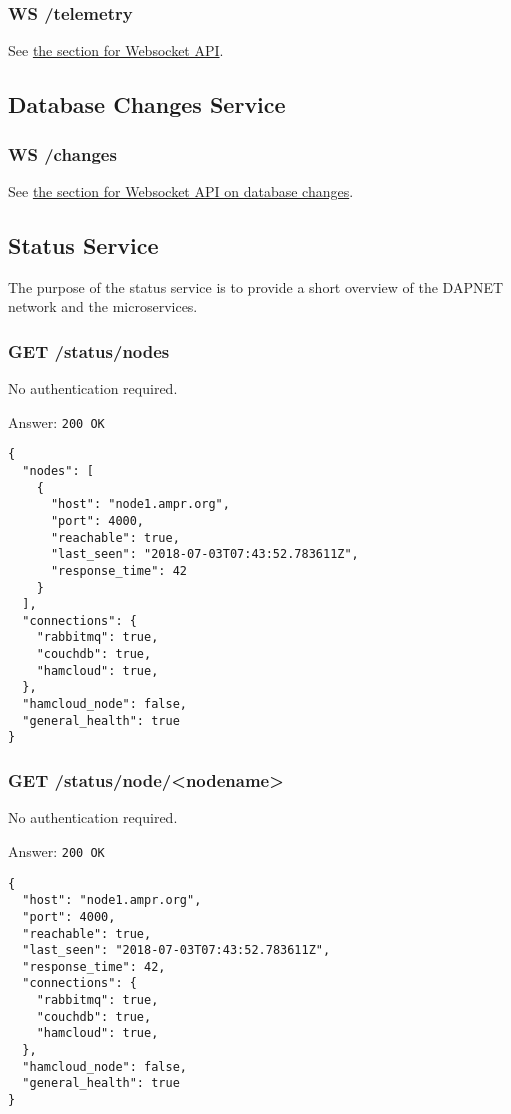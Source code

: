 \subsubsection{WS /telemetry}
See \hyperref[protocoldef:websocketapi]{the section for Websocket API}.


\subsection{Database Changes Service}

\subsubsection{WS /changes}
See \hyperref[protcoldef:websocketapi:databasechanges]{the section for Websocket API on database changes}.

\subsection{Status Service}
The purpose of the status service is to provide a short overview of the DAPNET network and the microservices.

\subsubsection{GET /status/nodes}
No authentication required.

Answer:
\texttt{200 OK}
\begin{lstlisting}
{
  "nodes": [
    {
      "host": "node1.ampr.org",
      "port": 4000,
      "reachable": true,
      "last_seen": "2018-07-03T07:43:52.783611Z",
      "response_time": 42
    }
  ],
  "connections": {
    "rabbitmq": true,
    "couchdb": true,
    "hamcloud": true,
  },
  "hamcloud_node": false,
  "general_health": true
}
\end{lstlisting}

\subsubsection{GET /status/node/<nodename>}
No authentication required.

Answer:
\texttt{200 OK}
\begin{lstlisting}
{
  "host": "node1.ampr.org",
  "port": 4000,
  "reachable": true,
  "last_seen": "2018-07-03T07:43:52.783611Z",
  "response_time": 42,
  "connections": {
    "rabbitmq": true,
    "couchdb": true,
    "hamcloud": true,
  },
  "hamcloud_node": false,
  "general_health": true
}
\end{lstlisting}


